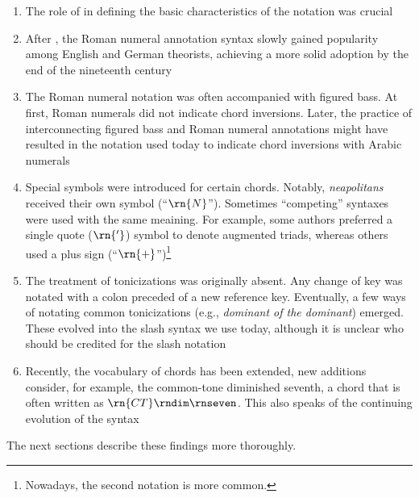 \begin{enumerate}
    \item The role of \textcite{weber1817versuch} in
    defining the basic characteristics of the notation was
    crucial
    \item After \textcite{weber1817versuch}, the Roman
    numeral annotation syntax slowly gained popularity among
    English and German theorists, achieving a more solid
    adoption by the end of the nineteenth century
    \item The Roman numeral notation was often accompanied
    with figured bass. At first, Roman numerals did not
    indicate chord inversions. Later, the practice of
    interconnecting figured bass and Roman numeral
    annotations might have resulted in the notation used
    today to indicate chord inversions with Arabic numerals
    \item Special symbols were introduced for certain
    chords. Notably, \emph{neapolitans} received their own
    symbol (``$\rn{N}$''). Sometimes ``competing'' syntaxes
    were used with the same meaining. For example, some
    authors preferred a single quote ($\rn{'}$) symbol to
    denote augmented triads, whereas others used a plus sign
    (``$\rn{+}$'')\footnote{Nowadays, the second notation is
    more common.}
    \item The treatment of tonicizations was originally
    absent. Any change of key was notated with a colon
    preceded of a new reference key. Eventually, a few ways
    of notating common tonicizations (e.g., \emph{dominant
    of the dominant}) emerged. These evolved into the slash
    syntax we use today, although it is unclear who should
    be credited for the slash notation
    \item Recently, the vocabulary of chords has been
    extended, new additions consider, for example, the
    common-tone diminished seventh, a chord that is often
    written as $\rn{CT}\rndim\rnseven$. This also speaks of
    the continuing evolution of the syntax
\end{enumerate}

The next sections describe these findings more thoroughly.
